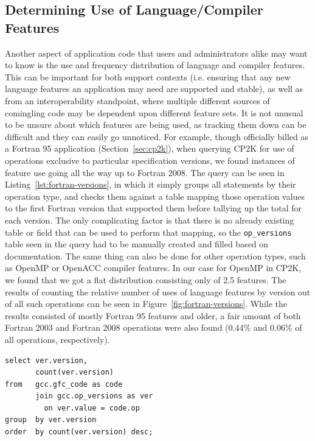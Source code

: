 \subsection{Determining Use of Language/Compiler Features}
Another aspect of application code that users and administrators alike may want to know is the use and frequency distribution of language and compiler features.
This can be important for both support contexts (i.e. ensuring that any new language features an application may need are supported and stable), as well as from an interoperability standpoint, where multiple different sources of comingling code may be dependent upon different feature sets.
It is not unusual to be unsure about which features are being used, as tracking them down can be difficult and they can easily go unnoticed.
For example, though officially billed as a Fortran 95 application (Section~\ref{sec:cp2k}), when querying CP2K for use of operations exclusive to particular specification versions, we found instances of feature use going all the way up to Fortran 2008.
The query can be seen in Listing~\ref{lst:fortran-versions}, in which it simply groups all statements by their operation type, and checks them against a table mapping those operation values to the first Fortran version that supported them before tallying up the total for each version.
The only complicating factor is that there is no already existing table or field that can be used to perform that mapping, so the \texttt{op\_versions} table seen in the query had to be manually created and filled based on documentation.
The same thing can also be done for other operation types, such as OpenMP or OpenACC compiler features.
In our case for OpenMP in CP2K, we found that we got a flat distribution consisting only of 2.5 features.
The results of counting the relative number of uses of language features by version out of all such operations can be seen in Figure~\ref{fig:fortran-versions}.
While the results consisted of mostly Fortran 95 features and older, a fair amount of both Fortran 2003 and Fortran 2008 operations were also found (0.44\% and 0.06\% of all operations, respectively).

\begin{lstlisting}[caption=Querying for Use of Fortran Language Features, label=lst:fortran-versions]
select ver.version,
       count(ver.version)
from   gcc.gfc_code as code
       join gcc.op_versions as ver
         on ver.value = code.op
group  by ver.version
order  by count(ver.version) desc;
\end{lstlisting}

